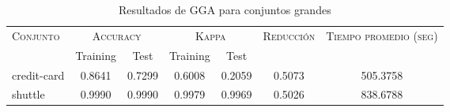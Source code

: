 \begin{table}[]
\centering
\begin{tabular}{l c c c c c c}
\hline
\multirow{2}{*}{\textsc{Conjunto}}
	& \multicolumn{2}{c}{\textsc{Accuracy}}
	& \multicolumn{2}{c}{\textsc{Kappa}}
	& \textsc{Reducción}
	& \textsc{Tiempo promedio (seg)} \\
	& Training & Test
	& Training & Test \\ 
\hline
\hline

credit-card & 0.8641 & 0.7299 & 0.6008 & 0.2059 & 0.5073 & 505.3758 \\
shuttle & 0.9990 & 0.9990 & 0.9979 & 0.9969 & 0.5026 & 838.6788 \\

\hline
\end{tabular}
\caption{Resultados de GGA para conjuntos grandes }
\label{res-grande-gga}
\end{table}

